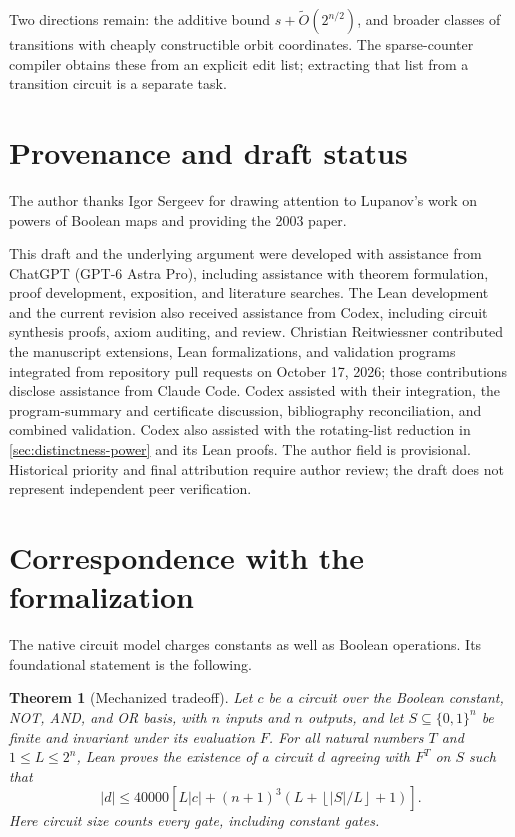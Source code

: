 \documentclass[11pt]{article}
\newtheorem{theorem}{Theorem}[section]
\theoremstyle{definition}
\theoremstyle{remark}
\newcommand{\bits}{\{0,1\}}
\newcommand{\floor}[1]{\left\lfloor #1\right\rfloor}
\numberwithin{equation}{section}
\begin{document}
Two directions remain: the additive bound
$s+\widetilde O(2^{n/2})$, and broader classes of transitions with cheaply
constructible orbit coordinates.  The sparse-counter compiler obtains these
from an explicit edit list; extracting that list from a transition circuit
is a separate task.

\section*{Provenance and draft status}

The author thanks Igor Sergeev for drawing attention to Lupanov's work
on powers of Boolean maps and providing the 2003 paper.

This draft and the underlying argument were developed with assistance
from ChatGPT (GPT-6 Astra Pro), including assistance with theorem
formulation, proof development, exposition, and literature searches.
The Lean development and the current revision also received assistance
from Codex, including circuit synthesis proofs, axiom auditing, and review.
Christian Reitwiessner contributed the manuscript extensions, Lean
formalizations, and validation programs integrated from repository pull
requests on October 17, 2026; those contributions disclose assistance
from Claude Code.  Codex assisted with their integration, the program-summary
and certificate discussion, bibliography reconciliation, and combined
validation. Codex also assisted with the rotating-list reduction in
\cref{sec:distinctness-power} and its Lean proofs.
The author field is provisional.  Historical priority and final
attribution require author review; the draft does not represent
independent peer verification.

\appendix
\section{Correspondence with the formalization}\label{app:lean-details}

The native circuit model charges constants as well as Boolean operations.
Its foundational statement is the following.

\begin{theorem}[Mechanized tradeoff]\label{thm:lean}
Let $c$ be a circuit over the Boolean constant, NOT, AND, and OR basis,
with $n$ inputs and $n$ outputs, and let $S\subseteq\bits^n$ be finite
and invariant under its evaluation $F$.  For all natural numbers $T$ and
$1\leq L\leq2^n$, Lean proves the existence of a circuit $d$ agreeing
with $F^T$ on $S$ such that
\[
 |d|\leq40000\left[L|c|+(n+1)^3
       \left(L+\floor{|S|/L}+1\right)\right].
\]
Here circuit size counts every gate, including constant gates.
\end{theorem}
\end{document}
